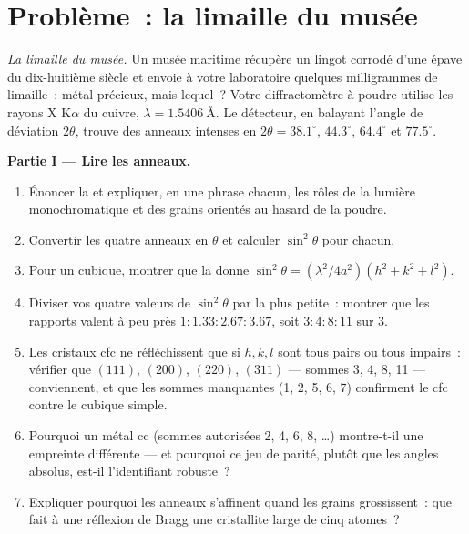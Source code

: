 \section{Problème~: la limaille du musée}

\begin{problem}\label{pb:b3:crystalline-solids:1}
\emph{La limaille du musée.} Un musée maritime récupère un lingot
corrodé d'une épave du dix-huitième siècle et envoie à votre
laboratoire quelques milligrammes de limaille~: métal précieux, mais
lequel~? Votre diffractomètre à poudre utilise les rayons X
K$\alpha$ du cuivre, $\lambda = \qty{1.5406}{\angstrom}$. Le
détecteur, en balayant l'angle de déviation $2\theta$, trouve des
anneaux intenses en $2\theta =
38.1^\circ$, $44.3^\circ$, $64.4^\circ$ et $77.5^\circ$.

\medskip\noindent\textbf{Partie I --- Lire les anneaux.}

\begin{enumerate}
  \item Énoncer la  et expliquer, en une phrase chacun,
        les rôles de la lumière monochromatique et des grains
        orientés au hasard de la poudre.
  \item Convertir les quatre anneaux en $\theta$ et calculer
        $\sin^2\theta$ pour chacun.
  \item Pour un  cubique, montrer que la  donne
        $\sin^2\theta = (\lambda^2/4a^2)(h^2 + k^2 + l^2)$.
  \item Diviser vos quatre valeurs de $\sin^2\theta$ par la plus
        petite~: montrer que les rapports valent à peu près
        $1 : 1.33 : 2.67 : 3.67$, soit $3 : 4 : 8 : 11$ sur 3.
  \item Les cristaux cfc ne réfléchissent que si $h, k, l$ sont tous
        pairs ou tous impairs~: vérifier que $(111)$, $(200)$,
        $(220)$, $(311)$ --- sommes 3, 4, 8, 11 --- conviennent, et
        que les sommes manquantes (1, 2, 5, 6, 7) confirment le cfc
        contre le cubique simple.
  \item Pourquoi un métal cc (sommes autorisées 2, 4, 6, 8, \dots)
        montre-t-il une empreinte différente --- et pourquoi ce jeu
        de parité, plutôt que les angles absolus, est-il
        l'identifiant robuste~?
  \item Expliquer pourquoi les anneaux s'affinent quand les grains
        grossissent~: que fait à une réflexion de Bragg une
        cristallite large de cinq atomes~?
\end{enumerate}


\end{problem}
